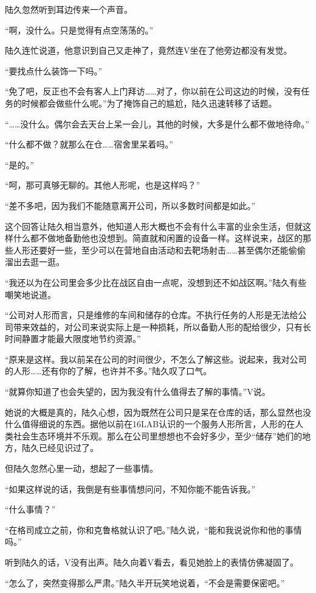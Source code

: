 陆久忽然听到耳边传来一个声音。

“啊，没什么。只是觉得有点空荡荡的。”

陆久连忙说道，他意识到自己又走神了，竟然连V坐在了他旁边都没有发觉。

“要找点什么装饰一下吗。”

“免了吧，反正也不会有客人上门拜访……对了，你以前在公司这边的时候，没有任务的时候都会做些什么呢。”为了掩饰自己的尴尬，陆久迅速转移了话题。

“……没什么。偶尔会去天台上呆一会儿，其他的时候，大多是什么都不做地待命。”

“什么都不做？就那么在仓……宿舍里呆着吗。”

“是的。”

“呵，那可真够无聊的。其他人形呢，也是这样吗？”

“差不多吧，因为我们不能随意离开公司，所以多数时间都是如此。”

这个回答让陆久相当意外，他知道人形大概也不会有什么丰富的业余生活，但就这样什么都不做地备勤他也没想到。简直就和闲置的设备一样。这样说来，战区的那些人形还要好一些，至少可以在营地自由活动和去靶场射击……甚至偶尔还能偷偷溜出去逛一逛。 

“我还以为在公司里会多少比在战区自由一点呢，没想到还不如战区啊。”陆久有些嘲笑地说道。

“公司对人形而言，只是维修的车间和储存的仓库。不执行任务的人形是无法给公司带来效益的，对公司来说实际上是一种损耗，所以备勤人形的配给很少，只有长时间静置才能最大限度地节约资源。”

“原来是这样。我以前呆在公司的时间很少，不怎么了解这些。说起来，我对公司的人形……还有你的了解，也许并不多。”陆久叹了口气。 

“就算你知道了也会失望的，因为我没有什么值得去了解的事情。”V说。

她说的大概是真的，陆久心想，因为既然在公司只是呆在仓库的话，那么显然也没什么值得细说的东西。据他以前在16LAB认识的一个服务人形所言，人形的在人类社会生态环境并不乐观。那么在公司里想想也不会好多少，至少“储存”她们的地方，陆久已经见识过了。

但陆久忽然心里一动，想起了一些事情。

“如果这样说的话，我倒是有些事情想问问，不知你能不能告诉我。”

“什么事情？”

“在格司成立之前，你和克鲁格就认识了吧。”陆久说，“能和我说说你和他的事情吗。”

听到陆久的话，V没有出声。陆久向着V看去，看见她脸上的表情仿佛凝固了。

“怎么了，突然变得那么严肃。”陆久半开玩笑地说着，“不会是需要保密吧。”

